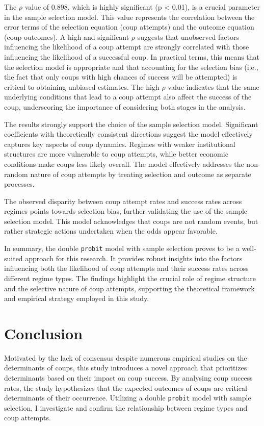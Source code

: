 \documentclass[
  12pt,
]{report}
\begin{document}
The \(\rho\) value of 0.898, which is highly significant (p \textless{}
0.01), is a crucial parameter in the sample selection model. This value
represents the correlation between the error terms of the selection
equation (coup attempts) and the outcome equation (coup outcomes). A
high and significant \(\rho\) suggests that unobserved factors
influencing the likelihood of a coup attempt are strongly correlated
with those influencing the likelihood of a successful coup. In practical
terms, this means that the selection model is appropriate and that
accounting for the selection bias (i.e., the fact that only coups with
high chances of success will be attempted) is critical to obtaining
unbiased estimates. The high \(\rho\) value indicates that the same
underlying conditions that lead to a coup attempt also affect the
success of the coup, underscoring the importance of considering both
stages in the analysis.

The results strongly support the choice of the sample selection model.
Significant coefficients with theoretically consistent directions
suggest the model effectively captures key aspects of coup dynamics.
Regimes with weaker institutional structures are more vulnerable to coup
attempts, while better economic conditions make coups less likely
overall. The model effectively addresses the non-random nature of coup
attempts by treating selection and outcome as separate processes.

The observed disparity between coup attempt rates and success rates
across regimes points towards selection bias, further validating the use
of the sample selection model. This model acknowledges that coups are
not random events, but rather strategic actions undertaken when the odds
appear favorable.

In summary, the double \texttt{probit} model with sample selection
proves to be a well-suited approach for this research. It provides
robust insights into the factors influencing both the likelihood of coup
attempts and their success rates across different regime types. The
findings highlight the crucial role of regime structure and the
selective nature of coup attempts, supporting the theoretical framework
and empirical strategy employed in this study.

\section{Conclusion}\label{conclusion}

Motivated by the lack of consensus despite numerous empirical studies on
the determinants of coups, this study introduces a novel approach that
prioritizes determinants based on their impact on coup success. By
analysing coup success rates, the study hypothesizes that the expected
outcomes of coups are critical determinants of their occurrence.
Utilizing a double \texttt{probit} model with sample selection, I
investigate and confirm the relationship between regime types and coup
attempts.
\end{document}
